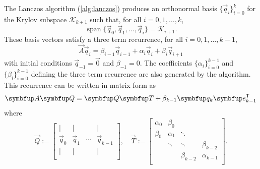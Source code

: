 The Lanczos algorithm (\cref{alg:lanczos}) \cite{lanczos_50} produces an orthonormal basis \( \{ \vec{q}_i \}_{i=0}^{k} \) for the Krylov subspace \( \mathcal{K}_{k+1} \) such that, for all \( i = 0, 1, \ldots, k \),
\begin{equation*}
    \operatorname{span}\{ \vec{q}_0, \vec{q}_1, \ldots, \vec{q}_{i} \} = 
    \mathcal{K}_{i+1}.
\end{equation*}
These basis vectors satisfy a three term recurrence, for all \( i = 0,1, \ldots,k-1 \),
\begin{equation*}
    \vec{A} \vec{q}_i = \beta_{i-1}\vec{q}_{i-1} + \alpha_i \vec{q}_i + \beta_i \vec{q}_{i+1}
\end{equation*}
with initial conditions \( \vec{q}_{-1} = \vec{0} \) and \( \beta_{-1} = 0 \).
The coefficients \( \{ \alpha_i \}_{i=0}^{k-1} \) and \( \{ \beta_i \}_{i=0}^{k-1} \) defining the three term recurrence are also generated by the algorithm.
This recurrence can be written in matrix form as
\begin{equation}
    \label{eqn:lanczos_three_term}
    \vec{A} \vec{Q} = \vec{Q} \vec{T} + \beta_{k-1} \vec{q}_k \vec{e}_{k-1}^\rT
\end{equation}
where 
\begin{equation*}
    \vec{Q} := 
    \begin{bmatrix}
        |&|&&|\\
        \vec{q}_0 & \vec{q}_1 & \cdots & \vec{q}_{k-1}\\
        |&|&&|\\
    \end{bmatrix}
    ,\quad
    \vec{T} := 
    \begin{bmatrix}
        \alpha_0 & \beta_0 \\
        \beta_0 & \alpha_1 & \ddots & \phantom{\ddots}\\
        &\ddots & \ddots & \beta_{k-2} \\
        &&\beta_{k-2} & \alpha_{k-1} \\
    \end{bmatrix}.
\end{equation*}

